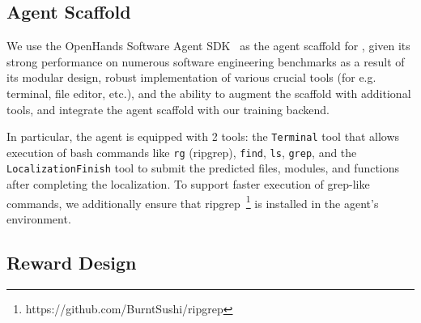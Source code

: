 



\subsection{Agent Scaffold}\label{sec:agent_scaffold}

We use the OpenHands Software Agent SDK~\cite{wang2025openhandssoftwareagentsdk} as the agent scaffold for \methodname, given its strong performance on numerous software engineering benchmarks as a result of its modular design, robust implementation of various crucial tools (for e.g. terminal, file editor, etc.), and the ability to augment the scaffold with additional tools, and integrate the agent scaffold with our training backend.

In particular, the agent is equipped with 2 tools: the \texttt{Terminal} tool that allows execution of bash commands like \texttt{rg} (ripgrep), \texttt{find}, \texttt{ls}, \texttt{grep}, and the \texttt{LocalizationFinish} tool to submit the predicted files, modules, and functions after completing the localization. To support faster execution of grep-like commands, we additionally ensure that ripgrep~\footnote{https://github.com/BurntSushi/ripgrep} is installed in the agent's environment.

\subsection{Reward Design}\label{sec:reward_design}

